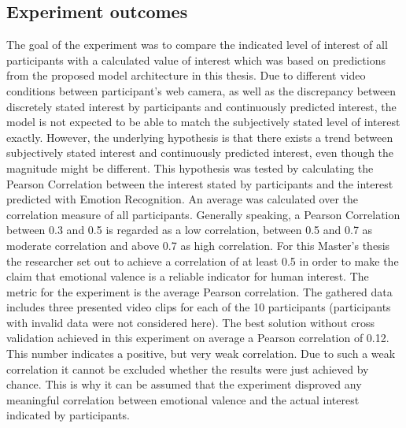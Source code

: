\subsection{Experiment outcomes}
The goal of the experiment was to compare the indicated level of interest of all participants with a calculated value of interest which was based on predictions from the proposed model architecture in this thesis.
\newline\newline
Due to different video conditions between participant's web camera, as well as the discrepancy between discretely stated interest by participants and continuously predicted interest, the model is not expected to be able to match the subjectively stated level of interest exactly. However, the underlying hypothesis is that there exists a trend between subjectively stated interest and continuously predicted interest, even though the magnitude might be different.
\newline\newline
This hypothesis was tested by calculating the Pearson Correlation between the interest stated by participants and the interest predicted with Emotion Recognition. An average was calculated over the correlation measure of all participants. 
\newline\newline
Generally speaking, a Pearson Correlation between 0.3 and 0.5 is regarded as a low correlation, between 0.5 and 0.7 as moderate correlation and above 0.7 as high correlation. For this Master's thesis the researcher set out to achieve a correlation of at least 0.5 in order to make the claim that emotional valence is a reliable indicator for human interest.
\newline\newline
The metric for the experiment is the average Pearson correlation. The gathered data includes three presented video clips for each of the 10 participants (participants with invalid data were not considered here). The best solution without cross validation achieved in this experiment on average a Pearson correlation of 0.12. This number indicates a positive, but very weak correlation. Due to such a weak correlation it cannot be excluded whether the results were just achieved by chance. This is why it can be assumed that the experiment disproved any meaningful correlation between emotional valence and the actual interest indicated by participants.
\newline\newline
